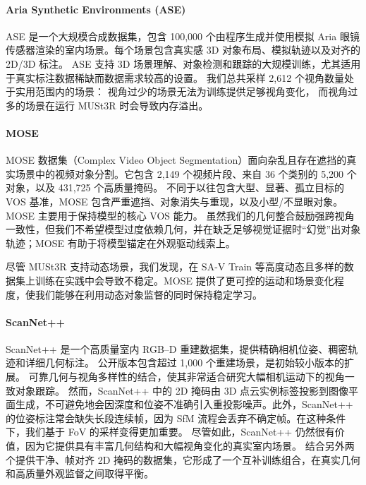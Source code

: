 \paragraph{Aria Synthetic Environments (ASE)~\cite{avetisyan2024scenescript}}
ASE 是一个大规模合成数据集，包含 100,000 个由程序生成并使用模拟 Aria 眼镜传感器渲染的室内场景。每个场景包含真实感 3D 对象布局、模拟轨迹以及对齐的 2D/3D 标注。
ASE 支持 3D 场景理解、对象检测和跟踪的大规模训练，尤其适用于真实标注数据稀缺而数据需求较高的设置。
我们总共采样 2{,}612 个视角数量处于实用范围内的场景：
视角过少的场景无法为训练提供足够视角变化，
而视角过多的场景在运行 MUSt3R 时会导致内存溢出。

\paragraph{MOSE~\cite{MOSE}}
MOSE 数据集（Complex Video Object Segmentation）面向杂乱且存在遮挡的真实场景中的视频对象分割。它包含 2,149 个视频片段、来自 36 个类别的 5,200 个对象，以及 431,725 个高质量掩码。
不同于以往包含大型、显著、孤立目标的 VOS 基准，MOSE 包含严重遮挡、对象消失与重现，以及小型/不显眼对象。
MOSE 主要用于保持模型的核心 VOS 能力。
虽然我们的几何整合鼓励强跨视角一致性，但我们不希望模型过度依赖几何，并在缺乏足够视觉证据时“幻觉”出对象轨迹；MOSE 有助于将模型锚定在外观驱动线索上。  

尽管 MUSt3R 支持动态场景，我们发现，在 SA-V Train 等高度动态且多样的数据集上训练在实践中会导致不稳定。MOSE 提供了更可控的运动和场景变化程度，使我们能够在利用动态对象监督的同时保持稳定学习。


\paragraph{ScanNet++~\cite{yeshwanth2023scannet++}}
ScanNet++ 是一个高质量室内 RGB--D 重建数据集，提供精确相机位姿、稠密轨迹和详细几何标注。
公开版本包含超过 1{,}000 个重建场景，是初始较小版本的扩展\cite{yeshwanth2023scannet++}。
可靠几何与视角多样性的结合，使其非常适合研究大幅相机运动下的视角一致对象跟踪。
然而，ScanNet++ 中的 2D 掩码由 3D 点云实例标签投影到图像平面生成，不可避免地会因深度和位姿不准确引入重投影噪声。此外，ScanNet++ 的位姿标注常会缺失长段连续帧，因为 SfM 流程会丢弃不确定帧。在这种条件下，我们基于 FoV 的采样变得更加重要。
尽管如此，ScanNet++ 仍然很有价值，因为它提供具有丰富几何结构和大幅视角变化的真实室内场景。
结合另外两个提供干净、帧对齐 2D 掩码的数据集，它形成了一个互补训练组合，在真实几何和高质量外观监督之间取得平衡。




